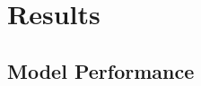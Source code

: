 \documentclass[a4paper,12pt]{report}
\begin{document}












\chapter{Results}



\section*{Model Performance} %
\end{document}
